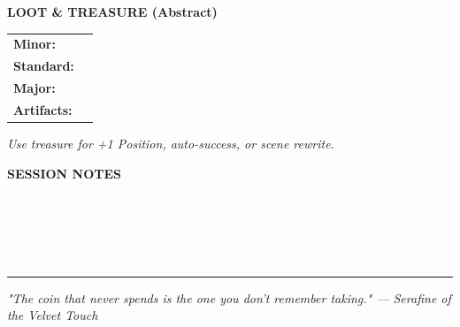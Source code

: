 \documentclass[11pt]{article}
\begin{document}
\begin{tcolorbox}[colback=white, colframe=fe-fate, sharp corners, boxrule=0.8pt, width=\linewidth, boxsep=2pt, left=4pt, right=4pt, top=2pt, bottom=2pt]
  {\bfseries\color{fe-fate} LOOT \& TREASURE (Abstract)}
  \vspace{2pt}
  
  \begin{tabular}{@{}p{3cm} p{5cm}@{}}
    \textbf{Minor:} & \underline{\hspace{5cm}} \\
    \textbf{Standard:} & \underline{\hspace{5cm}} \\
    \textbf{Major:} & \underline{\hspace{5cm}} \\
    \textbf{Artifacts:} & \underline{\hspace{5cm}} \\
  \end{tabular}
  \vspace{2pt}
  {\small\em Use treasure for +1 Position, auto-success, or scene rewrite.}
\end{tcolorbox}

\begin{tcolorbox}[colback=white, colframe=fe-dusk, sharp corners, boxrule=0.8pt, width=\linewidth, boxsep=2pt, left=4pt, right=4pt, top=2pt, bottom=2pt]
  {\bfseries\color{fe-dusk} SESSION NOTES}
  \vspace{2pt}
  
  \underline{\hspace{\linewidth}}\\
  \underline{\hspace{\linewidth}}\\
  \underline{\hspace{\linewidth}}\\
  \underline{\hspace{\linewidth}}\\
  \underline{\hspace{\linewidth}}
\end{tcolorbox}

\vspace{0.2cm}
\hrule
\vspace{0.1cm}
\begin{center}
  {\small\em "The coin that never spends is the one you don't remember taking." — Serafine of the Velvet Touch}
\end{center}
\end{document}
